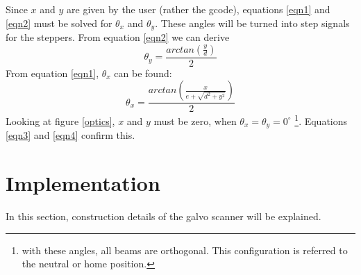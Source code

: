 \documentclass[a4paper, 11pt]{scrartcl}
\begin{document}
Since $x$ and $y$ are given by the user (rather the gcode), equations \ref{eqn1} and \ref{eqn2} must be solved for $\theta_x$ and $\theta_y$. These angles will be turned into step signals for the steppers. From equation \ref{eqn2} we can derive 
\begin{equation}\label{eqn3}
\theta_y = \frac{arctan(\frac{y}{d})}{2}
\end{equation} 
From equation \ref{eqn1}, $\theta_x$ can be found:
\begin{equation}\label{eqn4}
\theta_x=\frac{arctan\left( \frac{x}{e+\sqrt{d^2+y^2}}\right) }{2}
\end{equation}
Looking at figure \ref{optics}, $x$ and $y$ must be zero, when $\theta_x=\theta_y=0^\circ$ \footnote{with these angles, all beams are orthogonal. This configuration is referred to the neutral or home position.}. Equations \ref{eqn3} and \ref{eqn4} confirm this. 

\section{Implementation}
In this section, construction details of the galvo scanner will be explained.
\end{document}
